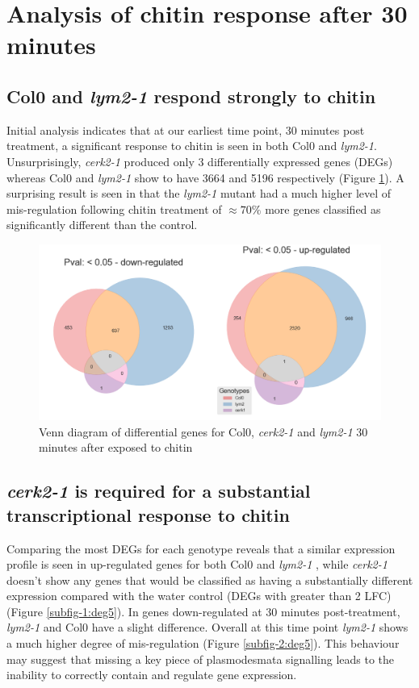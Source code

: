 \documentclass[../main.tex]{subfiles}
\begin{document}
\section{Analysis of chitin response after 30 minutes}
\label{sec:seqresults}

\subsection{Col0 and \textit{lym2-1} respond strongly to chitin}

Initial analysis indicates that at our earliest time point, 30 minutes post
treatment, a significant response to chitin is seen in both Col0 and
\textit{lym2-1}. Unsurprisingly, \textit{cerk2-1} produced only 3 differentially
expressed genes (DEGs) whereas Col0 and \textit{lym2-1} show to have 3664 and
5196 respectively (Figure \ref{fig:05hrDEGs}). A surprising result is seen in that the
\textit{lym2-1} mutant had a much higher level of mis-regulation following
chitin treatment of $\approx70\%$ more genes classified as significantly different
than the control.

\begin{figure}[ht]
  \centering
  \includegraphics[width=0.6\columnwidth]{figures/vennTreatmentschitin.png}
  \caption{\label{fig:05hrDEGs} Venn diagram of differential genes for Col0,
    \textit{cerk2-1} and \textit{lym2-1} 30 minutes after exposed to chitin}
\end{figure}

\subsection{\textit{cerk2-1} is required for a substantial transcriptional response to chitin}

Comparing the most DEGs for each genotype reveals that a similar expression
profile is seen in up-regulated genes for both Col0 and \textit{lym2-1} , while
\textit{cerk2-1} doesn't show any genes that would be classified as having a
substantially different expression compared with the water control (DEGs with
greater than 2 LFC) (Figure \ref{subfig-1:deg5}). In genes down-regulated at 30
minutes post-treatment, \textit{lym2-1} and Col0 have a slight difference.
Overall at this time point \textit{lym2-1} shows a much higher degree of
mis-regulation (Figure \ref{subfig-2:deg5}). This behaviour may suggest that
missing a key piece of plasmodesmata signalling leads to the inability to
correctly contain and regulate gene expression.
\end{document}
